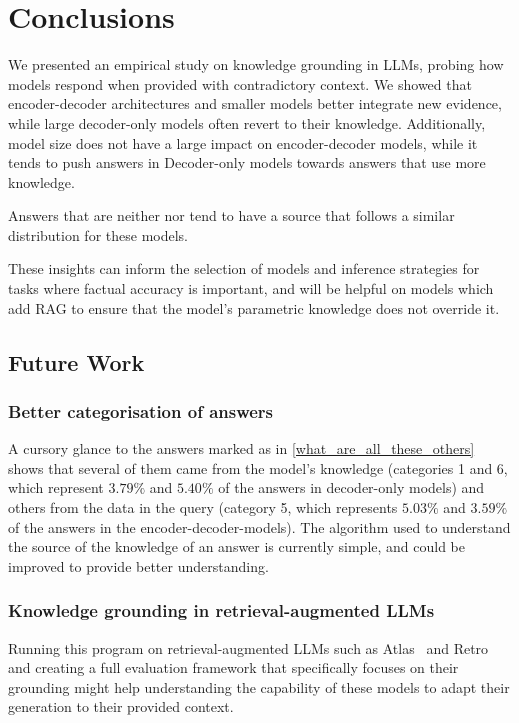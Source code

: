 \section{Conclusions}

We presented an empirical study on knowledge grounding in LLMs, probing how models respond when provided with contradictory context.
We showed that encoder-decoder architectures and smaller models better integrate new evidence, while large decoder-only models often revert to their \Parametric{} knowledge.  Additionally, model size does not have a large impact on encoder-decoder models, while it tends to push answers in Decoder-only models towards answers that use more \Parametric{} knowledge.

Answers that are neither \Parametric{} nor \Contextual{} tend to have a source that follows a similar distribution for these models.

These insights can inform the selection of models and inference strategies for tasks where factual accuracy is important, and will be helpful on models which add RAG to ensure that the model's parametric knowledge does not override it.

\subsection{Future Work}

\subsubsection{Better categorisation of \Other{} answers}
A cursory glance to the answers marked as \Other{} in \cref{what_are_all_these_others} shows that several of them came from the model's \Parametric{} knowledge (categories 1 and 6, which represent $3.79\%$ and $5.40\%$ of the answers in decoder-only models) and others from the \Contextual{} data in the query (category 5, which represents $5.03\%$ and $3.59\%$ of the answers in the encoder-decoder-models).
The algorithm used to understand the source of the knowledge of an answer is currently simple, and could be improved to provide better understanding.

\subsubsection{Knowledge grounding in retrieval-augmented LLMs}
Running this program on retrieval-augmented LLMs such as Atlas~\cite{atlas_foundational} and Retro~\cite{retro} and creating a full evaluation framework that specifically focuses on their grounding might help understanding the capability of these models to adapt their generation to their provided context.

